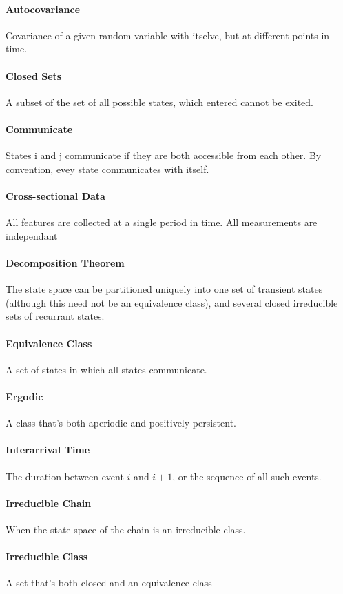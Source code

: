 \documentclass[12pt]{article}
\begin{document}
    \paragraph{Autocovariance} Covariance of a given random variable with itselve, but at different points in time.
    \paragraph{Closed Sets} A subset of the set of all possible states, which entered cannot be exited.
    \paragraph{Communicate} States i and j communicate if they are both accessible from each other. By convention, evey state communicates with itself.
    \paragraph{Cross-sectional Data} All features are collected at a single period in time. All measurements are independant
    \paragraph{Decomposition Theorem} The state space can be partitioned uniquely into one set of transient states (although this need not be an equivalence class), and several closed irreducible sets of recurrant states.
    \paragraph{Equivalence Class} A set of states in which all states communicate.
    \paragraph{Ergodic} A class that's both aperiodic and positively persistent.
    \paragraph{Interarrival Time} The duration between event \(i\) and \(i+1\), or the sequence of all such events.
    \paragraph{Irreducible Chain} When the state space of the chain is an irreducible class.
    \paragraph{Irreducible Class} A set that's both closed and an equivalence class
\end{document}
